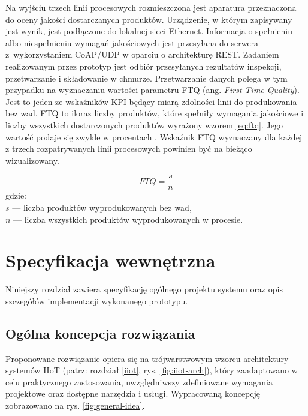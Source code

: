 \documentclass[a4paper, 12pt, twoside]{article}
\begin{document}
Na wyjściu trzech linii procesowych rozmieszczona jest aparatura przeznaczona
do oceny jakości dostarczanych produktów. Urządzenie,
w którym zapisywany jest wynik, jest podłączone do lokalnej sieci Ethernet.
Informacja o spełnieniu albo niespełnieniu wymagań jakościowych jest przesyłana
do serwera z~wykorzystaniem CoAP/UDP w oparciu o architekturę REST. Zadaniem
realizowanym przez prototyp jest odbiór przesyłanych rezultatów inspekcji,
przetwarzanie i składowanie w chmurze. Przetwarzanie
danych polega w tym przypadku na wyznaczaniu wartości parametru FTQ
(ang. \emph{First Time Quality}). Jest to jeden ze wskaźników KPI będący miarą
zdolności linii do produkowania bez wad. FTQ to iloraz liczby produktów,
które spełniły wymagania jakościowe i liczby wszystkich dostarczonych produktów
wyrażony wzorem \eqref{eq:ftq}.
Jego wartość podaje się zwykle w procentach \cite{isp}. Wskaźnik FTQ
wyznaczany dla każdej z trzech rozpatrywanych linii procesowych powinien być na bieżąco wizualizowany.

\begin{equation}
      FTQ = \frac{s}{n}\label{eq:ftq}
\end{equation}
\noindent gdzie: \\
$s$ --- liczba produktów wyprodukowanych bez wad,\\
$n$ --- liczba wszystkich produktów wyprodukowanych w procesie.



\section{Specyfikacja wewnętrzna}\label{spec-wew}

Niniejszy rozdział zawiera specyfikację ogólnego projektu systemu oraz
opis szczegółów implementacji wykonanego prototypu.

\subsection{Ogólna koncepcja rozwiązania}\label{ogolna-koncepcja}

Proponowane rozwiązanie opiera się na trójwarstwowym wzorcu architektury
systemów IIoT (patrz: rozdział \ref{iiot}, rys. \ref{fig:iiot-arch}), który
zaadaptowano w celu praktycznego zastosowania, uwzględniwszy zdefiniowane
wymagania projektowe oraz dostępne narzędzia i usługi. Wypracowaną koncepcję
zobrazowano na rys. \ref{fig:general-idea}.
\end{document}
